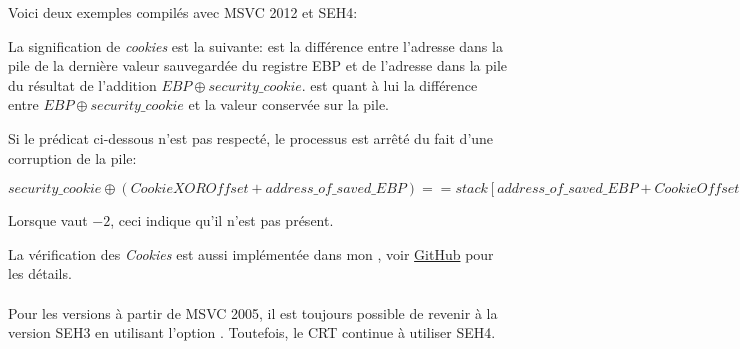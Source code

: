 \def\SEHfour{1}


Voici deux exemples compilés avec MSVC 2012 et SEH4:





La signification de \emph{cookies} est la suivante:  est la différence entre l'adresse
dans la pile de la dernière valeur sauvegardée du registre EBP et de l'adresse dans la pile du
résultat de l'addition $EBP \oplus security\_cookie$.
 est quant à lui la différence entre $EBP \oplus security\_cookie$ et la valeur
conservée sur la pile.

Si le prédicat ci-dessous n'est pas respecté, le processus est arrêté du fait d'une corruption
de la pile:

\begin{center}
$security\_cookie \oplus (CookieXOROffset + address\_of\_saved\_EBP) == stack[address\_of\_saved\_EBP + CookieOffset]$
\end{center}

Lorsque  vaut $-2$, ceci indique qu'il n'est pas présent.

La vérification des \emph{Cookies} est aussi implémentée dans mon \tracer{},
voir \href{http://go.yurichev.com/17061}{GitHub} pour les détails.\\
\\
Pour les versions à partir de MSVC 2005, il est toujours possible de revenir à la version SEH3
en utilisant l'option . Toutefois, le \ac{CRT} continue à utiliser SEH4.

